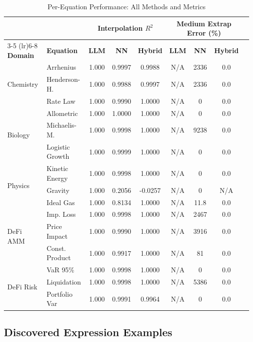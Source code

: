 \begin{table}[htbp]
\centering
\caption{Per-Equation Performance: All Methods and Metrics}
\label{tab:per_equation}
\tiny
\begin{tabular}{llccccccc}
\toprule
& & \multicolumn{3}{c}{\textbf{Interpolation $R^2$}} & \multicolumn{3}{c}{\textbf{Medium Extrap Error (\%)}} \\
\cmidrule(lr){3-5} \cmidrule(lr){6-8}
\textbf{Domain} & \textbf{Equation} & \textbf{LLM} & \textbf{NN} & \textbf{Hybrid} & \textbf{LLM} & \textbf{NN} & \textbf{Hybrid} \\
\midrule
\multirow{3}{*}{Chemistry}
& Arrhenius & 1.000 & 0.9997 & 0.9988 & N/A & 2336 & 0.0 \\
& Henderson-H. & 1.000 & 0.9988 & 0.9997 & N/A & 2336 & 0.0 \\
& Rate Law & 1.000 & 0.9990 & 1.0000 & N/A & 0 & 0.0 \\
\midrule
\multirow{3}{*}{Biology}
& Allometric & 1.000 & 1.0000 & 1.0000 & N/A & 0 & 0.0 \\
& Michaelis-M. & 1.000 & 0.9998 & 1.0000 & N/A & 9238 & 0.0 \\
& Logistic Growth & 1.000 & 0.9999 & 1.0000 & N/A & 0 & 0.0 \\
\midrule
\multirow{3}{*}{Physics}
& Kinetic Energy & 1.000 & 0.9998 & 1.0000 & N/A & 0 & 0.0 \\
& Gravity & 1.000 & 0.2056 & -0.0257 & N/A & 0 & N/A \\
& Ideal Gas & 1.000 & 0.8134 & 1.0000 & N/A & 11.8 & 0.0 \\
\midrule
\multirow{3}{*}{DeFi AMM}
& Imp. Loss & 1.000 & 0.9998 & 1.0000 & N/A & 2467 & 0.0 \\
& Price Impact & 1.000 & 0.9990 & 1.0000 & N/A & 3916 & 0.0 \\
& Const. Product & 1.000 & 0.9917 & 1.0000 & N/A & 81 & 0.0 \\
\midrule
\multirow{3}{*}{DeFi Risk}
& VaR 95\% & 1.000 & 0.9998 & 1.0000 & N/A & 0 & 0.0 \\
& Liquidation & 1.000 & 0.9998 & 1.0000 & N/A & 5386 & 0.0 \\
& Portfolio Var & 1.000 & 0.9991 & 0.9964 & N/A & 0 & 0.0 \\
\bottomrule
\end{tabular}
\end{table}

\subsection{Discovered Expression Examples}

